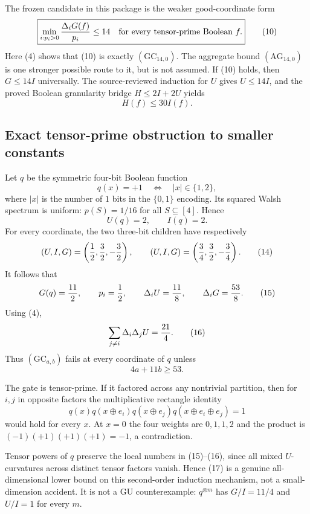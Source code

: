 The frozen candidate in this package is the weaker good-coordinate form
\[
 \boxed{\min_{i:p_i>0}{\Delta_iG(f)\over p_i}\le14
 \quad\hbox{for every tensor-prime Boolean }f.}       \tag{10}
\]
Here (4) shows that (10) is exactly $(\mathrm{GC}_{14,0})$.  The aggregate
bound $(\mathrm{AG}_{14,0})$ is one stronger possible route to it, but is
not assumed.  If (10) holds, then $G\le14I$ universally.  The source-reviewed induction
for $U$ gives $U\le14I$, and the proved Boolean granularity bridge
$H\le2I+2U$ yields
\[
 \boxed{H(f)\le30I(f).}                               \tag{11}
\]

\subsection*{Exact tensor-prime obstruction to smaller constants}

Let $q$ be the symmetric four-bit Boolean function
\[
 q(x)=+1\quad\Longleftrightarrow\quad |x|\in\{1,2\}, \tag{12}
\]
where $|x|$ is the number of $1$ bits in the $\{0,1\}$ encoding.  Its
squared Walsh spectrum is uniform: $p(S)=1/16$ for all $S\subseteq[4]$.
Hence
\[
 U(q)=2,\qquad I(q)=2.                                \tag{13}
\]
For every coordinate, the two three-bit children have respectively
\[
 (U,I,G)=\left({1\over2},{3\over2},-{3\over2}\right),
 \qquad
 (U,I,G)=\left({3\over4},{3\over2},-{3\over4}\right). \tag{14}
\]
It follows that
\[
 G(q)={11\over2},\qquad p_i={1\over2},\qquad
 \Delta_iU={11\over8},\qquad
 \Delta_iG={53\over8}.                               \tag{15}
\]
Using (4),
\[
 \sum_{j\ne i}\Delta_i\Delta_jU={21\over4}.          \tag{16}
\]
Thus $(\mathrm{GC}_{a,b})$ fails at every coordinate of $q$ unless
\[
 \boxed{4a+11b\ge53.}                                \tag{17}
\]

The gate is tensor-prime.  If it factored across any nontrivial partition,
then for $i,j$ in opposite factors the multiplicative rectangle identity
\[
 q(x)q(x\oplus e_i)q(x\oplus e_j)q(x\oplus e_i\oplus e_j)=1
\]
would hold for every $x$.  At $x=0$ the four weights are $0,1,1,2$ and
the product is $(-1)(+1)(+1)(+1)=-1$, a contradiction.

Tensor powers of $q$ preserve the local numbers in (15)--(16), since all
mixed $U$-curvatures across distinct tensor factors vanish.  Hence (17)
is a genuine all-dimensional lower bound on this second-order induction
mechanism, not a small-dimension accident.  It is not a GU counterexample:
$q^{\otimes m}$ has $G/I=11/4$ and $U/I=1$ for every $m$.

